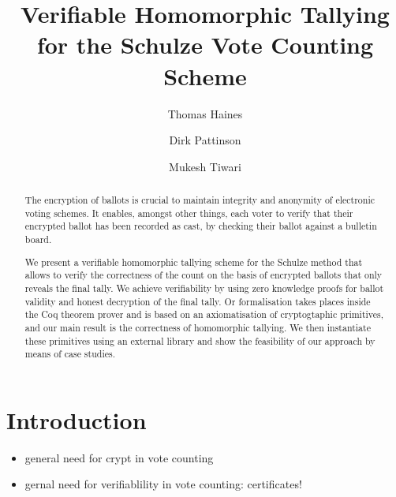 \documentclass{llncs}
\begin{document}
\title{Verifiable Homomorphic Tallying for the Schulze Vote Counting
Scheme}

\author{Thomas Haines  \and
      Dirk Pattinson \and Mukesh Tiwari }
\maketitle

\begin{abstract}
The encryption of ballots is crucial to maintain integrity and 
anonymity of electronic voting schemes. It enables, amongst other 
things, each voter to verify that their encrypted ballot has been 
recorded as cast, by checking their ballot against a bulletin board. 

We present a verifiable homomorphic tallying scheme for the Schulze 
method that allows to verify the correctness of the count on the 
basis of encrypted ballots that only reveals the final tally. We 
achieve verifiability by using zero knowledge proofs for ballot 
validity and honest decryption of the final tally. Or formalisation 
takes places inside the Coq theorem prover and is based on an 
axiomatisation of cryptogtaphic primitives, and our main result is 
the correctness of homomorphic tallying. We then instantiate 
these primitives using an external library and show the feasibility 
of our approach by means of case studies.
\end{abstract}


\section{Introduction}
\begin{itemize}
  \item general need for crypt in vote counting
  \item gernal need for verifiablility in vote counting:
  certificates!
\end{itemize}
\end{document}
